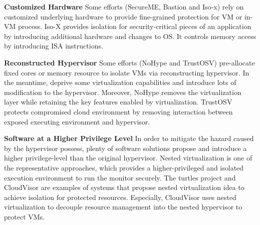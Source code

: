 \documentclass[conference]{IEEEtran}
\begin{document}
\textbf{Customized Hardware }
Some efforts (SecureME\cite{Chhabra2011SecureME}, Bastion\cite{Champagne2010Scalable} and Iso-x\cite{Evtyushkin2015Iso}) rely on 
customized underlying hardware to provide fine-grained protection for VM or in-VM process. 
Iso-X provides isolation for security-critical pieces of an application by introducing additional hardware and changes to OS. It controls memory access by introducing ISA instructions. 



\textbf{Reconstructed Hypervisor }
Some efforts (NoHype\cite{NoHype} and TrustOSV\cite{TrustOSV}) pre-allocate fixed cores or memory resource to isolate VMs via reconstructing hypervisor. In the meantime, deprive some virtualization capabilities and introduce lots of modification to the hypervisor. Moreover, NoHype removes the virtualization layer while retaining the key features enabled by virtualization. TrustOSV protects compromised cloud environment by removing interaction between exposed executing environment and hypervisor.

 
\textbf{Software at a Higher Privilege Level}
In order to mitigate the hazard caused by the hypervisor possess, plenty of software solutions propose and introduce a higher privilege-level than the original hypervisor. Nested virtualization is one of the representative approaches, which provides a higher-privileged and isolated execution environment to run the monitor securely. The turtles project \cite{Ben2007The} and CloudVisor \cite{Zhang2011CloudVisor} are examples of systems that propose nested virtualization idea to achieve isolation for protected resources. Especially, CloudVisor uses nested virtualization to decouple resource management into the nested hypervisor to protect VMs. %

\end{document}
